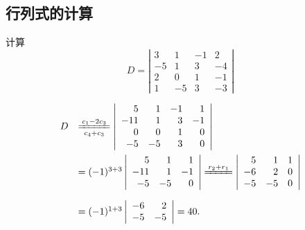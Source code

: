 \documentclass[10pt,a4paper%
tablecaptionabove]{article}
\begin{document}
\begin{CJK}{UTF8}{gkai}
  \section{行列式的计算}
  \begin{li}
    计算
    $$
    D = \left|
      \begin{array}{rrrr}
        3   &  1  &  -1  &  2 \\
        -5  &  1  &   3  & -4 \\
        2   &  0  &   1  & -1 \\
        1   & -5  &   3  &  -3 
      \end{array}
    \right|
    $$
  \end{li}
  \begin{jie}
    $$
    \begin{array}{ll}
      D&  \xlongequal[c_4+c_3]{c_1-2c_3}  \left|
         \begin{array}{rrrr}
           5  & 1 & -1 & 1  \\
           -11 & 1 &  3 & -1 \\
           0 & 0 &  1 & 0 \\
           -5 & -5 & 3 & 0 
         \end{array}
                         \right|\\[0.8cm]
       & = (-1)^{3+3} \left| 
         \begin{array}{rrr}
           5 & 1 & 1\\
           -11 & 1 & -1 \\
           -5 & -5 & 0
         \end{array}
                     \right| 
                     \xlongequal{r_2+r_1}
                     \left|
                     \begin{array}{rrr}
                       5 & 1 & 1\\
                       -6 & 2 & 0 \\
                       -5 & -5 & 0
                     \end{array}
                                 \right|\\[0.8cm]
       &  = (-1)^{1+3} \left|
         \begin{array}{rr}
           -6 &  2\\
           -5 & -5
         \end{array}
                \right| = 40.
    \end{array}
    $$    
  \end{jie}


\end{CJK}
\end{document}
